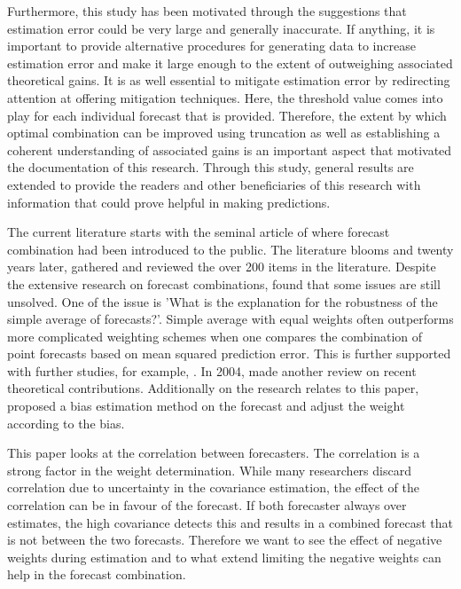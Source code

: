 \documentclass[11pt]{article}
\begin{document}
Furthermore, this study has been motivated through the suggestions that estimation error could be very large and generally inaccurate. If anything, it is important to provide alternative procedures for generating data to increase estimation error and make it large enough to the extent of outweighing associated theoretical gains. It is as well essential to mitigate estimation error by redirecting attention at offering mitigation techniques. Here, the threshold value comes into play for each individual forecast that is provided. Therefore, the extent by which optimal combination can be improved using truncation as well as establishing a coherent understanding of associated gains is an important aspect that motivated the documentation of this research. Through this study, general results are extended to provide the readers and other beneficiaries of this research with information that could prove helpful in making predictions.

The current literature starts with the seminal article of \cite{Bates1969} where forecast combination had been introduced to the public. The literature blooms and twenty years later, \cite{Clemen1989} gathered and reviewed the over 200 items in the literature. Despite the extensive research on forecast combinations, \citeauthor{Clemen1989} found that some issues are still unsolved. One of the issue is 'What is the explanation for the robustness of the simple average of forecasts?'. Simple average with equal weights often outperforms more complicated weighting schemes when one compares the combination of point forecasts based on mean squared prediction error. This is further supported with further studies, for example, \citep{Stock2004}. In 2004, \citeauthor{Elliot2004} made another review on recent theoretical contributions. Additionally on the research relates to this paper, \cite{Gibbs2017} proposed a bias estimation method on the forecast and adjust the weight according to the bias.

This paper looks at the correlation between forecasters. The correlation is a strong factor in the weight determination. While many researchers discard correlation due to uncertainty in the covariance estimation, the effect of the correlation can be in favour of the forecast. If both forecaster always over estimates, the high covariance detects this and results in a combined forecast that is not between the two forecasts. Therefore we want to see the effect of negative weights during estimation and to what extend limiting the negative weights can help in the forecast combination.
\end{document}
